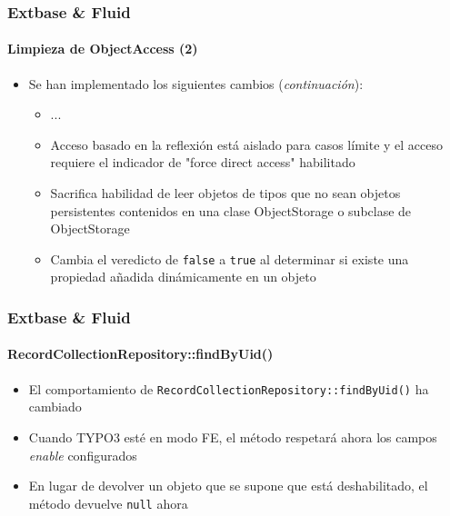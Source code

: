 \begin{frame}[fragile]
	\frametitle{Extbase \& Fluid}
	\framesubtitle{Limpieza de ObjectAccess (2)}

	\begin{itemize}

		\item Se han implementado los siguientes cambios (\textit{continuación}):

			\begin{itemize}
				\item ...
				\item Acceso basado en la reflexión está aislado para casos límite y el acceso requiere el indicador de "force direct access" habilitado
				\item Sacrifica habilidad de leer objetos de tipos que no sean objetos persistentes contenidos en una clase ObjectStorage o subclase de ObjectStorage
				\item Cambia el veredicto de \texttt{false} a \texttt{true} al determinar si existe una propiedad añadida dinámicamente en un objeto
			\end{itemize}

	\end{itemize}

\end{frame}


\begin{frame}[fragile]
	\frametitle{Extbase \& Fluid}
	\framesubtitle{RecordCollectionRepository::findByUid()}

	\begin{itemize}
		\item El comportamiento de \texttt{RecordCollectionRepository::findByUid()} ha cambiado
		\item Cuando TYPO3 esté en modo FE, el método respetará ahora los campos \textit{enable} configurados
		\item En lugar de devolver un objeto que se supone que está deshabilitado, el método devuelve \texttt{null} ahora

	\end{itemize}

\end{frame}

